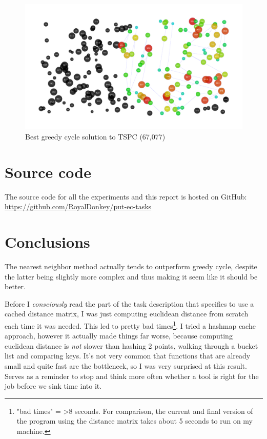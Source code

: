 \documentclass[14pt]{article}
\begin{document}
\begin{figure}[H]
	\begin{adjustwidth}{-3em}{0}
		\includegraphics{results/best_greedy-cycle_TSPC.pdf}
	\end{adjustwidth}
	\vspace{-15mm}
	\caption{Best greedy cycle solution to TSPC (67,077)}
\end{figure}

\section{Source code}
The source code for all the experiments and this report is hosted on GitHub: \\
\url{https://github.com/RoyalDonkey/put-ec-tasks}

\section{Conclusions}
The nearest neighbor method actually tends to outperform greedy cycle, despite
the latter being slightly more complex and thus making it seem like it should
be better.

Before I \emph{consciously} read the part of the task description that
specifies to use a cached distance matrix, I was just computing euclidean
distance from scratch each time it was needed. This led to pretty bad
times\footnote{"bad times" = >8 seconds. For comparison, the current and final
version of the program using the distance matrix takes about 5 seconds to run
on my machine.}. I tried a hashmap cache approach, however it actually made
things far worse, because computing euclidean distance is \emph{not} slower
than hashing 2 points, walking through a bucket list and comparing keys. It's
not very common that functions that are already small and quite fast are the
bottleneck, so I was very surprised at this result. Serves as a reminder to
stop and think more often whether a tool is right for the job before we sink
time into it.
\end{document}
